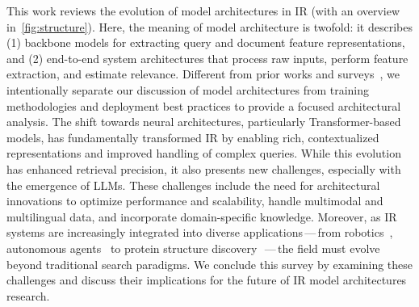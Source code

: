 This work reviews the evolution of model architectures in IR (with an overview in~\cref{fig:structure}). Here, the meaning of model architecture is twofold: it describes (1) backbone models for extracting query and document feature representations, and (2) end-to-end system architectures that process raw inputs, perform feature extraction, and estimate relevance.
Different from prior works and surveys~\cite{lin2022pretrained,zhu2023large}, we intentionally separate our discussion of model architectures from training methodologies and deployment best practices to provide a focused architectural analysis.
The shift towards neural architectures, particularly Transformer-based models, has fundamentally transformed IR by enabling rich, contextualized representations and improved handling of complex queries. While this evolution has enhanced retrieval precision, it also presents new challenges, especially with the emergence of LLMs.
These challenges include the need for architectural innovations to optimize performance and scalability, handle multimodal and multilingual data, and incorporate domain-specific knowledge. Moreover, as IR systems are increasingly integrated into diverse applications\,---\,from robotics~\cite{xie2024embodiedrag}, autonomous agents~\cite{wu2023autogen} to protein structure discovery~\cite{jumper2021highly}\,---\,the field must evolve beyond traditional search paradigms. We conclude this survey by examining these challenges and discuss their implications for the future of IR model architectures research. 
